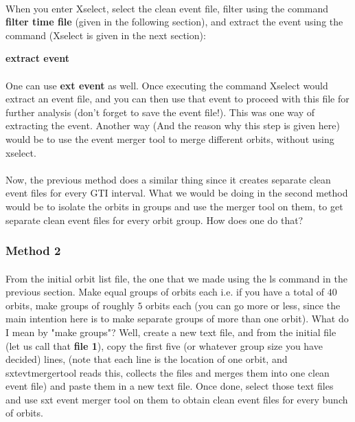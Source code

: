 \documentclass[a4paper,twoside]{report}
\numberwithin{equation}{section}
\begin{document}
\paragraph{}
When you enter Xselect, select the clean event file, filter using the command \textbf{filter time file} (given in the following section), and extract the event using the command (Xselect is given in the next section): 
\begin{center}
\large \textbf{extract event}
\end{center}
\paragraph{}
One can use \textbf{ext event} as well. Once executing the command Xselect would extract an event file, and you can then use that event to proceed with this file for further analysis (don't forget to save the event file!). This was one way of extracting the event. Another way (And the reason why this step is given here) would be to use the event merger tool to merge different orbits, without using xselect.
\paragraph{}
Now, the previous method does a similar thing since it creates separate clean event files for every GTI interval. What we would be doing in the second method would be to isolate the orbits in groups and use the merger tool on them, to get separate clean event files for every orbit group. How does one do that?
\subsubsection{Method 2}
\paragraph{}
From the initial orbit list file, the one that we made using the ls command in the previous section. Make equal groups of orbits each i.e. if you have a total of $40$ orbits, make groups of roughly $5$ orbits each (you can go more or less, since the main intention here is to make separate groups of more than one orbit). What do I mean by "make groups"? Well, create a new text file, and from the initial file (let us call that \textbf{file 1}), copy the first five (or whatever group size you have decided) lines, (note that each line is the location of one orbit, and sxtevtmergertool reads this, collects the files and merges them into one clean event file) and paste them in a new text file. Once done, select those text files and use sxt event merger tool on them to obtain clean event files for every bunch of orbits. 
\end{document}
